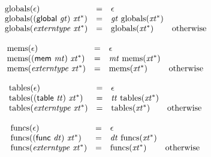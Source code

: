 $$
\begin{array}[t]{@{}lcl@{}l@{}}
{\mathrm{globals}}(\epsilon) & = & \epsilon \\
{\mathrm{globals}}((\mathsf{global}~{\mathit{gt}})~{{\mathit{xt}}^\ast}) & = & {\mathit{gt}}~{\mathrm{globals}}({{\mathit{xt}}^\ast}) \\
{\mathrm{globals}}({\mathit{externtype}}~{{\mathit{xt}}^\ast}) & = & {\mathrm{globals}}({{\mathit{xt}}^\ast}) & \quad \mbox{otherwise} \\
\end{array}
$$

$$
\begin{array}[t]{@{}lcl@{}l@{}}
{\mathrm{mems}}(\epsilon) & = & \epsilon \\
{\mathrm{mems}}((\mathsf{mem}~{\mathit{mt}})~{{\mathit{xt}}^\ast}) & = & {\mathit{mt}}~{\mathrm{mems}}({{\mathit{xt}}^\ast}) \\
{\mathrm{mems}}({\mathit{externtype}}~{{\mathit{xt}}^\ast}) & = & {\mathrm{mems}}({{\mathit{xt}}^\ast}) & \quad \mbox{otherwise} \\
\end{array}
$$

$$
\begin{array}[t]{@{}lcl@{}l@{}}
{\mathrm{tables}}(\epsilon) & = & \epsilon \\
{\mathrm{tables}}((\mathsf{table}~{\mathit{tt}})~{{\mathit{xt}}^\ast}) & = & {\mathit{tt}}~{\mathrm{tables}}({{\mathit{xt}}^\ast}) \\
{\mathrm{tables}}({\mathit{externtype}}~{{\mathit{xt}}^\ast}) & = & {\mathrm{tables}}({{\mathit{xt}}^\ast}) & \quad \mbox{otherwise} \\
\end{array}
$$

$$
\begin{array}[t]{@{}lcl@{}l@{}}
{\mathrm{funcs}}(\epsilon) & = & \epsilon \\
{\mathrm{funcs}}((\mathsf{func}~{\mathit{dt}})~{{\mathit{xt}}^\ast}) & = & {\mathit{dt}}~{\mathrm{funcs}}({{\mathit{xt}}^\ast}) \\
{\mathrm{funcs}}({\mathit{externtype}}~{{\mathit{xt}}^\ast}) & = & {\mathrm{funcs}}({{\mathit{xt}}^\ast}) & \quad \mbox{otherwise} \\
\end{array}
$$

\vspace{1ex}

\vspace{1ex}

